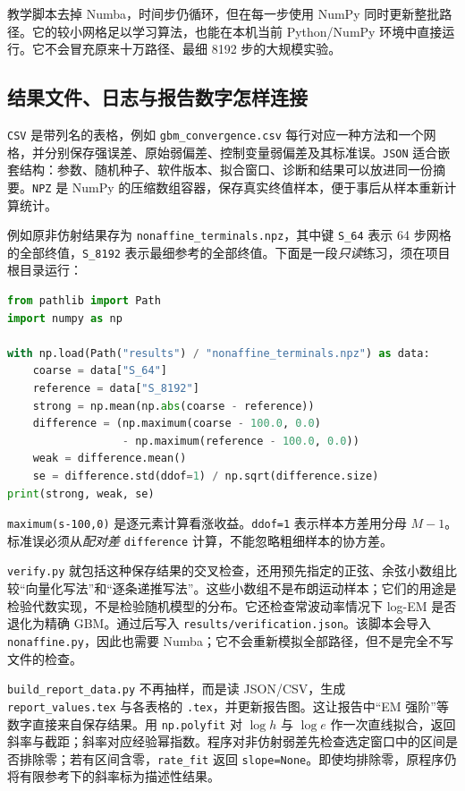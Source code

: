 教学脚本去掉 Numba，时间步仍循环，但在每一步使用 NumPy 同时更新整批路径。它的较小网格足以学习算法，也能在本机当前 Python/NumPy 环境中直接运行。它不会冒充原来十万路径、最细 8192 步的大规模实验。

\subsection{结果文件、日志与报告数字怎样连接}

\texttt{CSV} 是带列名的表格，例如 \texttt{gbm\_convergence.csv} 每行对应一种方法和一个网格，并分别保存强误差、原始弱偏差、控制变量弱偏差及其标准误。\texttt{JSON} 适合嵌套结构：参数、随机种子、软件版本、拟合窗口、诊断和结果可以放进同一份摘要。\texttt{NPZ} 是 NumPy 的压缩数组容器，保存真实终值样本，便于事后从样本重新计算统计。

例如原非仿射结果存为 \texttt{nonaffine\_terminals.npz}，其中键 \texttt{S\_64} 表示 64 步网格的全部终值，\texttt{S\_8192} 表示最细参考的全部终值。下面是一段\emph{只读}练习，须在项目根目录运行：
\begin{lstlisting}[language=Python]
from pathlib import Path
import numpy as np

with np.load(Path("results") / "nonaffine_terminals.npz") as data:
    coarse = data["S_64"]
    reference = data["S_8192"]
    strong = np.mean(np.abs(coarse - reference))
    difference = (np.maximum(coarse - 100.0, 0.0)
                  - np.maximum(reference - 100.0, 0.0))
    weak = difference.mean()
    se = difference.std(ddof=1) / np.sqrt(difference.size)
print(strong, weak, se)
\end{lstlisting}
\texttt{maximum(s-100,0)} 是逐元素计算看涨收益。\texttt{ddof=1} 表示样本方差用分母 $M-1$。标准误必须从\emph{配对差} \texttt{difference} 计算，不能忽略粗细样本的协方差。

\texttt{verify.py} 就包括这种保存结果的交叉检查，还用预先指定的正弦、余弦小数组比较“向量化写法”和“逐条递推写法”。这些小数组不是布朗运动样本；它们的用途是检验代数实现，不是检验随机模型的分布。它还检查常波动率情况下 log-EM 是否退化为精确 GBM。通过后写入 \texttt{results/verification.json}。该脚本会导入 \texttt{nonaffine.py}，因此也需要 Numba；它不会重新模拟全部路径，但不是完全不写文件的检查。

\texttt{build\_report\_data.py} 不再抽样，而是读 JSON/CSV，生成 \texttt{report\_values.tex} 与各表格的 \texttt{.tex}，并更新报告图。这让报告中“EM 强阶”等数字直接来自保存结果。用 \texttt{np.polyfit} 对 $\log h$ 与 $\log e$ 作一次直线拟合，返回斜率与截距；斜率对应经验幂指数。程序对非仿射弱差先检查选定窗口中的区间是否排除零；若有区间含零，\texttt{rate\_fit} 返回 \texttt{slope=None}。即使均排除零，原程序仍将有限参考下的斜率标为描述性结果。

